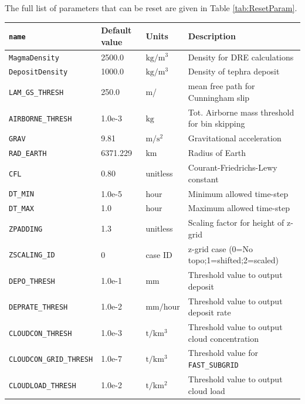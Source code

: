 The full list of parameters that can be reset are given in Table \ref{tab:ResetParam}.
\small
\begin{table}[htbp]
\begin{center}
\begin{tabular}{| l | l | l | l |}
\hline
\texttt{name} & Default value & Units & Description \\
\hline
\texttt{MagmaDensity}      & 2500.0   & $\mathrm{kg/m^3}$  &  Density for DRE calculations \\
\texttt{DepositDensity}    & 1000.0   & $\mathrm{kg/m^3}$  &  Density of tephra deposit \\
\texttt{LAM\_GS\_THRESH}   & 250.0    & $\mathrm{m}$/      &  mean free path for Cunningham slip \\
\texttt{AIRBORNE\_THRESH}  & 1.0e-3   & $\mathrm{kg}$      &  Tot. Airborne mass threshold for bin skipping \\
\texttt{GRAV}              & 9.81     & $\mathrm{m/s^2}$   &  Gravitational acceleration \\
\texttt{RAD\_EARTH}        & 6371.229 & $\mathrm{km}$      &  Radius of Earth \\
\texttt{CFL}               & 0.80     & unitless           &  Courant-Friedrichs-Lewy constant \\
\texttt{DT\_MIN}           & 1.0e-5   & $\mathrm{hour}$    &  Minimum allowed time-step \\
\texttt{DT\_MAX}           & 1.0      & $\mathrm{hour}$    &  Maximum allowed time-step \\
\texttt{ZPADDING}          & 1.3      & unitless           &  Scaling factor for height of z-grid \\
\texttt{ZSCALING\_ID}      & 0        & case ID            &  z-grid case (0=No topo;1=shifted;2=scaled) \\
\texttt{DEPO\_THRESH}      & 1.0e-1   & $\mathrm{mm}$      &  Threshold value to output deposit \\
\texttt{DEPRATE\_THRESH}   & 1.0e-2   & $\mathrm{mm/hour}$ &  Threshold value to output deposit rate \\
\texttt{CLOUDCON\_THRESH}  & 1.0e-3   & $\mathrm{t/km^3}$  &  Threshold value to output cloud concentration \\
\texttt{CLOUDCON\_GRID\_THRESH}&1.0e-7& $\mathrm{t/km^3}$  &  Threshold value for \texttt{FAST\_SUBGRID} \\
\texttt{CLOUDLOAD\_THRESH} & 1.0e-2   & $\mathrm{t/km^2}$  &  Threshold value to output cloud load \\

\end{tabular}
\end{center}
\end{table}

